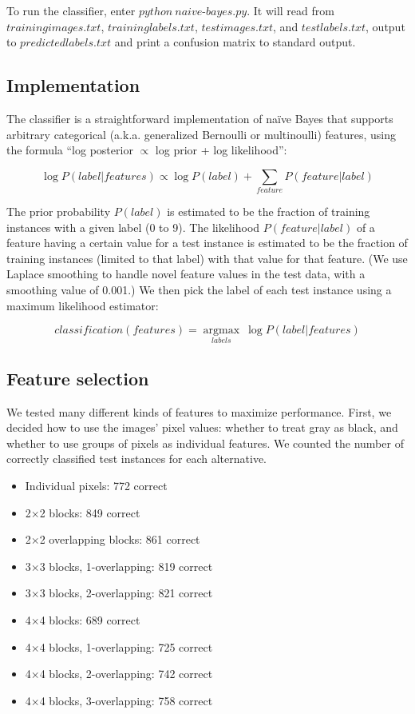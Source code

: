 \documentclass[11pt]{article}
\begin{document}
To run the classifier, enter $python\ naive\text{-}bayes.py$. It will read from
$trainingimages.txt$, $traininglabels.txt$, $testimages.txt$, and $testlabels.txt$,
output to $predictedlabels.txt$ and print a confusion matrix to standard output.

\subsection{Implementation}

The classifier is a straightforward implementation of na{\"i}ve Bayes that supports
arbitrary categorical (a.k.a. generalized Bernoulli or multinoulli) features, using
the formula ``log posterior $\propto$ log prior + log likelihood'':

$$\log P(label|features) \propto \log P(label) + \sum_{feature} P(feature|label)$$

The prior probability $P(label)$ is estimated to be the fraction of training instances
with a given label (0 to 9). The likelihood $P(feature|label)$ of a feature having a
certain value for a test instance is estimated to be the fraction of training instances
(limited to that label) with that value for that feature. (We use Laplace smoothing to
handle novel feature values in the test data, with a smoothing value of 0.001.) We then
pick the label of each test instance using a maximum likelihood estimator:

$$classification(features) = \underset{labels}{\operatorname{argmax}} \ \log P(label|features)$$

\subsection{Feature selection}

We tested many different kinds of features to maximize performance. First, we decided
how to use the images' pixel values: whether to treat gray as black, and whether to use
groups of pixels as individual features. We counted the number of correctly classified
test instances for each alternative.

\begin{itemize}[noitemsep]
\item Individual pixels: 772 correct
\item 2$\times$2 blocks: 849 correct
\item 2$\times$2 overlapping blocks: 861 correct
\item 3$\times$3 blocks, 1-overlapping: 819 correct
\item 3$\times$3 blocks, 2-overlapping: 821 correct
\item 4$\times$4 blocks: 689 correct
\item 4$\times$4 blocks, 1-overlapping: 725 correct
\item 4$\times$4 blocks, 2-overlapping: 742 correct
\item 4$\times$4 blocks, 3-overlapping: 758 correct
\end{itemize}
\end{document}
